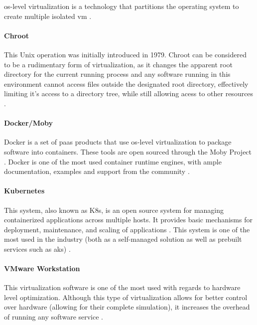 \acrshort{os}-level virtualization is a technology that partitions the operating system to create multiple isolated \acrfull{vm} \parencite{10.5555/1571423}. 

\paragraph{Chroot} This Unix operation was initially introduced in 1979. Chroot can be considered to be a rudimentary form of virtualization, as it changes the apparent root directory for the current running process and any software running in this environment cannot access files outside the designated root directory, effectively limiting it's access to a directory tree, while still allowing acess to other resources \parencite{foundation_2017}.

\paragraph{Docker/Moby} Docker is a set of \acrfull{paas} products that use \acrshort{os}-level virtualization to package software into containers. These tools are open sourced through the Moby Project \parencite{moby_oro}. Docker is one of the most used container runtime engines, with ample documentation, examples and support from the community \parencite[p. 20]{stateofcontainers}.


\paragraph{Kubernetes} This system, also known as K8s, is an open source system for managing containerized applications across multiple hosts. It provides basic mechanisms for deployment, maintenance, and scaling of applications \parencite{kubernetes}. This system is one of the most used in the industry (both as a self-managed solution as well as prebuilt services such as \acrfull{aks}) \parencite{stateofcontainers}.

\paragraph{VMware Workstation} This virtualization software is one of the most used with regards to hardware level optimization. Although this type of virtualization allows for better control over hardware (allowing for their complete simulation), it increases the overhead of running any software service \parencite{bauer_2019}.

